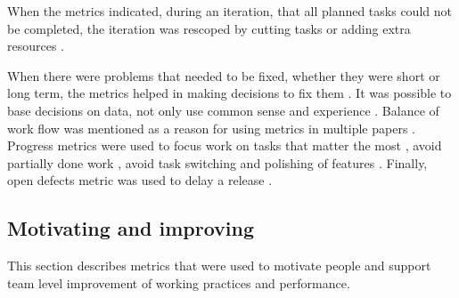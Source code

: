 \documentclass{sig-alternate}
\newcommand{\eetu}[1]{\ignorespaces}
\newcommand{\juha}[1]{\ignorespaces}
\begin{document}

When the metrics indicated, during an iteration, that all planned tasks could
not be completed, the iteration was rescoped by cutting tasks
\cite{Mahnic201273,Dubinsky200512,Middleton2007387} or adding extra resources
\cite{Dubinsky200512,Middleton2007387}.

When there were problems that needed to be fixed, whether they were short or long term, the metrics helped in making decisions to fix them
\cite{Staron20101069,Dubinsky200512,Petersen2011975,LNBIP01490121}.
It was possible to base decisions on data, not only use common sense and
experience \cite{Talby200940}. Balance of work flow was mentioned as a reason
for using metrics in multiple papers
\cite{Polk2011263,Petersen2010654,Petersen20101275,Greening2010,Petersen2011975,Dubinsky200512,Jakobsen2011168}.
Progress metrics were used to focus work on tasks that matter the most \cite{Talby200940}, avoid partially done work \cite{Seikola2011321}, avoid task switching \cite{Seikola2011321}
and polishing of features \cite{Talby200940}. 
\juha{ep�agiili k�yt�nt�, kerro lis��}\eetu{En n�e mit��n ep�agiilia
t�ss�.}Finally, open defects metric was used
to delay a release \cite{Hodgetts2004106}.


\subsection{Motivating and improving}
\label{sec:Motivate}
This section describes metrics that were used to motivate people and support team level
improvement of working practices and performance.
\end{document}
